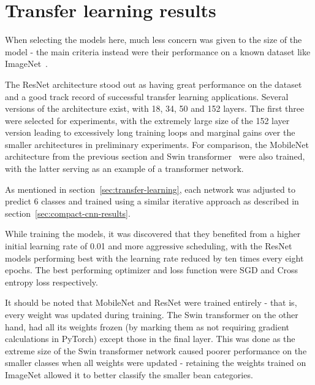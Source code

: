 \section{Transfer learning results}
\label{sec:transfer-learning-results}
When selecting the models here, much less concern was given to the size of the model - the main criteria instead were
their performance on a known dataset like ImageNet~\cite{imageNet}.

The ResNet architecture stood out as having great performance on the dataset and a good track record of successful
transfer learning applications.
Several versions of the architecture exist, with 18, 34, 50 and 152 layers.
The first three were selected for experiments, with the extremely large size of the 152 layer version leading to excessively long
training loops and marginal gains over the smaller architectures in preliminary experiments.
For comparison, the MobileNet architecture from the previous section and Swin transformer~\cite{swinTransformer} were also trained,
with the latter serving as an example of a transformer network.

As mentioned in section~\ref{sec:transfer-learning}, each network was adjusted to predict 6 classes and trained using a similar
iterative approach as described in section~\ref{sec:compact-cnn-results}.

While training the models, it was discovered that they benefited from a higher initial learning rate of 0.01 and more aggressive scheduling,
with the ResNet models performing best with the learning rate reduced by ten times every eight epochs.
The best performing optimizer and loss function were SGD and Cross entropy loss respectively.

It should be noted that MobileNet and ResNet were trained entirely - that is, every weight was updated during training.
The Swin transformer on the other hand, had all its weights frozen (by marking them as not requiring gradient calculations in PyTorch)
except those in the final layer.
This was done as the extreme size of the Swin transformer network caused poorer performance on the smaller classes when all weights were updated -
retaining the weights trained on ImageNet allowed it to better classify the smaller bean categories.

